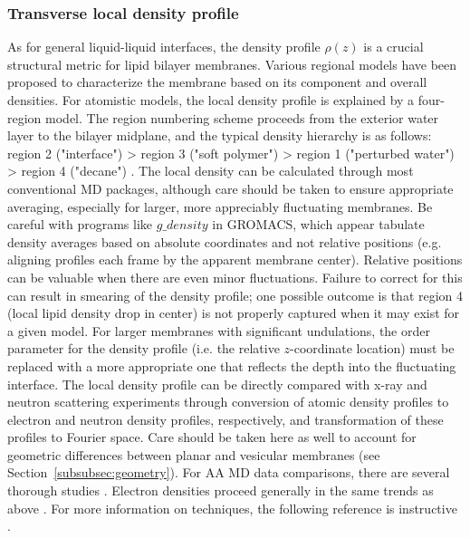 \documentclass[9pt,bestpractices]{livecoms}
\begin{document}
\subsubsection{Transverse local density profile}
\label{subsubsec:locdens}
As for general liquid-liquid interfaces, the density profile $\rho(z)$ is a crucial structural metric for lipid bilayer membranes.
Various regional models have been proposed to characterize the membrane based on its component and overall densities.
For atomistic models, the local density profile is explained by a four-region model.
The region numbering scheme proceeds from the exterior water layer to the bilayer midplane, and the typical density hierarchy is as follows: region 2 ("interface") > region 3 ("soft polymer") > region 1 ("perturbed water") > region 4 ("decane") \cite{Tieleman1997b}.
The local density can be calculated through most conventional MD packages, although care should be taken to ensure appropriate averaging, especially for larger, more appreciably fluctuating membranes.
Be careful with programs like $g\_density$ in GROMACS, which appear tabulate density averages based on absolute coordinates and not relative positions (e.g. aligning profiles each frame by the apparent membrane center).
Relative positions can be valuable when there are even minor fluctuations.
Failure to correct for this can result in smearing of the density profile; one possible outcome is that region 4 (local lipid density drop in center) is not properly captured when it may exist for a given model.
For larger membranes with significant undulations, the order parameter for the density profile (i.e. the relative $z$-coordinate location) must be replaced with a more appropriate one that reflects the depth into the fluctuating interface.
The local density profile can be directly compared with x-ray and neutron scattering experiments through conversion of atomic density profiles to electron and neutron density profiles, respectively, and transformation of these profiles to Fourier space.
Care should be taken here as well to account for geometric differences between planar and vesicular membranes (see Section~\ref{subsubsec:geometry}).
For AA MD data comparisons, there are several thorough studies \cite{Braun2011,Klauda2006a}.
Electron densities proceed generally in the same trends as above \cite{Klauda2010d}.
For more information on techniques, the following reference is instructive \cite{Poger2016}.
\end{document}
